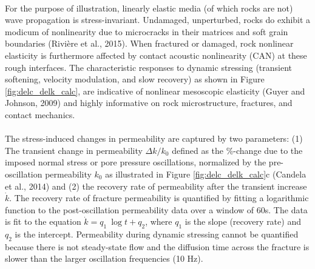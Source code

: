 \documentclass[letterpaper,10pt]{article}
\begin{document}
\paragraph{}
For the purpose of illustration, linearly elastic media (of which rocks are not) wave propagation is stress-invariant. Undamaged, unperturbed, rocks do exhibit a modicum of nonlinearity due to microcracks in their matrices and soft grain boundaries (Rivière et al., 2015). When fractured or damaged, rock nonlinear elasticity is furthermore affected by contact acoustic nonlinearity (CAN) at these rough interfaces. The characteristic responses to dynamic stressing (transient softening, velocity modulation, and slow recovery) as shown in Figure \ref{fig:delc_delk_calc}, are indicative of nonlinear mesoscopic elasticity (Guyer and Johnson, 2009) and highly informative on rock microstructure, fractures, and contact mechanics.
\paragraph{}
The stress-induced changes in permeability are captured by two parameters: (1) The transient change in permeability $ \Delta k/k_0 $ defined as the \%-change due to the imposed normal stress or pore pressure oscillations, normalized by the pre-oscillation permeability $ k_0 $ as illustrated in Figure \ref{fig:delc_delk_calc}c (Candela et al., 2014) and (2) the recovery rate of permeability after the transient increase $ \dot k $. The recovery rate of fracture permeability is quantified by fitting a logarithmic function to the post-oscillation permeability data over a window of 60s. The data is fit to the equation $ \dot k = q_1\ \log{t} + q_2 $, where $q_1$ is the slope (recovery rate) and $q_2$ is the intercept. Permeability during dynamic stressing cannot be quantified because there is not steady-state flow and the diffusion time across the fracture is slower than the larger oscillation frequencies (10 Hz). 
\end{document}
